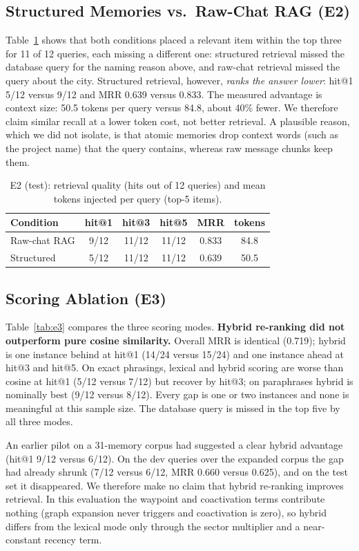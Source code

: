 \documentclass[conference]{IEEEtran}
\begin{document}
\subsection{Structured Memories vs.\ Raw-Chat RAG (E2)}
Table~\ref{tab:e2} shows that both conditions placed a relevant item within the
top three for 11 of 12 queries, each missing a different one: structured
retrieval missed the database query for the naming reason above, and raw-chat
retrieval missed the query about the city. Structured retrieval, however,
\emph{ranks the answer lower}: hit@1 5/12 versus 9/12 and MRR 0.639 versus
0.833. The measured advantage is context size: 50.5 tokens per query versus 84.8,
about 40\% fewer. We therefore claim similar recall at a lower token cost, not
better retrieval. A plausible reason, which we did not isolate, is that atomic
memories drop context words (such as the project name) that the query contains,
whereas raw message chunks keep them.

\begin{table}[t]
\caption{E2 (test): retrieval quality (hits out of 12 queries) and mean tokens
injected per query (top-5 items).}
\label{tab:e2}
\centering\footnotesize
\begin{tabular}{@{}lccccc@{}}
\toprule
Condition & hit@1 & hit@3 & hit@5 & MRR & tokens \\
\midrule
Raw-chat RAG & 9/12 & 11/12 & 11/12 & 0.833 & 84.8 \\
Structured   & 5/12 & 11/12 & 11/12 & 0.639 & 50.5 \\
\bottomrule
\end{tabular}
\end{table}

\subsection{Scoring Ablation (E3)}
Table~\ref{tab:e3} compares the three scoring modes. \textbf{Hybrid re-ranking did
not outperform pure cosine similarity.} Overall MRR is identical (0.719); hybrid
is one instance behind at hit@1 (14/24 versus 15/24) and one instance ahead at
hit@3 and hit@5. On exact phrasings, lexical and hybrid scoring are worse than
cosine at hit@1 (5/12 versus 7/12) but recover by hit@3; on paraphrases hybrid is
nominally best (9/12 versus 8/12). Every gap is one or two instances and none is
meaningful at this sample size. The database query is missed in the top five by
all three modes.

An earlier pilot on a 31-memory corpus had suggested a clear hybrid advantage
(hit@1 9/12 versus 6/12). On the dev queries over the expanded corpus the gap had
already shrunk (7/12 versus 6/12, MRR 0.660 versus 0.625), and on the test set it
disappeared. We therefore make no claim that hybrid re-ranking improves
retrieval. In this evaluation the waypoint and coactivation terms contribute
nothing (graph expansion never triggers and coactivation is zero), so hybrid
differs from the lexical mode only through the sector multiplier and a
near-constant recency term.
\end{document}
